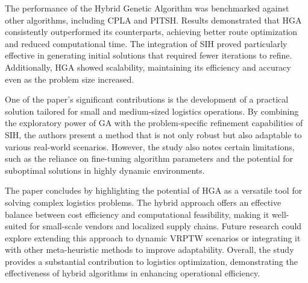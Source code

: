 The performance of the Hybrid Genetic Algorithm was benchmarked against other algorithms, including CPLA and PITSH. Results demonstrated that HGA consistently outperformed its counterparts, achieving better route optimization and reduced computational time. The integration of SIH proved particularly effective in generating initial solutions that required fewer iterations to refine. Additionally, HGA showed scalability, maintaining its efficiency and accuracy even as the problem size increased.

One of the paper’s significant contributions is the development of a practical solution tailored for small and medium-sized logistics operations. By combining the exploratory power of GA with the problem-specific refinement capabilities of SIH, the authors present a method that is not only robust but also adaptable to various real-world scenarios. However, the study also notes certain limitations, such as the reliance on fine-tuning algorithm parameters and the potential for suboptimal solutions in highly dynamic environments.

The paper concludes by highlighting the potential of HGA as a versatile tool for solving complex logistics problems. The hybrid approach offers an effective balance between cost efficiency and computational feasibility, making it well-suited for small-scale vendors and localized supply chains. Future research could explore extending this approach to dynamic VRPTW scenarios or integrating it with other meta-heuristic methods to improve adaptability. Overall, the study provides a substantial contribution to logistics optimization, demonstrating the effectiveness of hybrid algorithms in enhancing operational efficiency.
